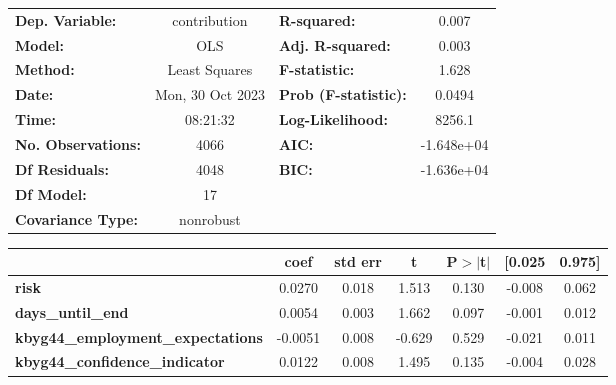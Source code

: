 \begin{center}
\begin{tabular}{lclc}
\toprule
\textbf{Dep. Variable:}                     &   contribution   & \textbf{  R-squared:         } &     0.007   \\
\textbf{Model:}                             &       OLS        & \textbf{  Adj. R-squared:    } &     0.003   \\
\textbf{Method:}                            &  Least Squares   & \textbf{  F-statistic:       } &     1.628   \\
\textbf{Date:}                              & Mon, 30 Oct 2023 & \textbf{  Prob (F-statistic):} &   0.0494    \\
\textbf{Time:}                              &     08:21:32     & \textbf{  Log-Likelihood:    } &    8256.1   \\
\textbf{No. Observations:}                  &        4066      & \textbf{  AIC:               } & -1.648e+04  \\
\textbf{Df Residuals:}                      &        4048      & \textbf{  BIC:               } & -1.636e+04  \\
\textbf{Df Model:}                          &          17      & \textbf{                     } &             \\
\textbf{Covariance Type:}                   &    nonrobust     & \textbf{                     } &             \\
\bottomrule
\end{tabular}
\begin{tabular}{lcccccc}
                                            & \textbf{coef} & \textbf{std err} & \textbf{t} & \textbf{P$> |$t$|$} & \textbf{[0.025} & \textbf{0.975]}  \\
\midrule
\textbf{risk}                               &       0.0270  &        0.018     &     1.513  &         0.130        &       -0.008    &        0.062     \\
\textbf{days\_until\_end}                   &       0.0054  &        0.003     &     1.662  &         0.097        &       -0.001    &        0.012     \\
\textbf{kbyg44\_employment\_expectations}   &      -0.0051  &        0.008     &    -0.629  &         0.529        &       -0.021    &        0.011     \\
\textbf{kbyg44\_confidence\_indicator}      &       0.0122  &        0.008     &     1.495  &         0.135        &       -0.004    &        0.028     \\

\end{tabular}
\end{center}
